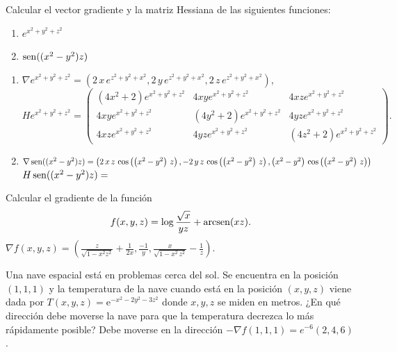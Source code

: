 {Calcular el vector gradiente y la matriz Hessiana de las siguientes funciones:
\begin{multicols}{2}
\begin{enumerate}
\item $e^{x^2+y^2+z^2}$
\item $\operatorname{sen}((x^2-y^2)z)$
\end{enumerate}
\end{multicols}
}
{\begin{enumerate}
\item $\nabla e^{x^2+y^2+z^2} = \left( 2\,x\,e^{z^2+y^2+x^2} , 2\,y\,e^{z^2+y^2+x^2} , 2\,z\,e^{z^2 +y^2+x^2} \right)$,\\
$
H e^{x^2+y^2+z^2} =
\left(
\begin{array}{ccc}
(4x^2+2)e^{x^2+y^2+z^2} & 4xye^{x^2+y^2+z^2} & 4xze^{x^2+y^2+z^2} \\
4xye^{x^2+y^2+z^2} & (4y^2+2)e^{x^2+y^2+z^2} & 4yze^{x^2+y^2+z^2} \\
4xze^{x^2+y^2+z^2} & 4yze^{x^2+y^2+z^2} & (4z^2+2)e^{x^2+y^2+z^2}
\end{array}
\right).
$
\item $\nabla \operatorname{sen}((x^2-y^2)z) = \left( 2\,x\,z\,\cos \left(\left(x^2-y^2\right)\,z\right) , -2\,y\, z\,\cos \left(\left(x^2-y^2\right)\,z\right) , \left(x^2-y^2\right) \,\cos \left(\left(x^2-y^2\right)\,z\right) \right) $\\
$H \operatorname{sen}((x^2-y^2)z) =$\\
\end{enumerate}
}
{
}


{Calcular el gradiente de la función
\[ f(x,y,z)=\log \frac{\sqrt{x}}{yz}+\operatorname{arcsen} (xz). \]
}
{$\nabla f(x,y,z) = \left( \frac{z}{\sqrt{1-x^2z^2}}+\frac{1}{2x} ,\frac{-1}{y} , \frac{x}{\sqrt{1-x^2\,z^2}}-\frac{1}{z} \right) $.
}
{
}


{Una nave espacial está en problemas cerca del sol.
Se encuentra en la posición $(1,1,1)$ y la temperatura de la nave cuando está en la posición $(x,y,z)$ viene dada por
$T(x,y,z)=\mbox{e}^{-x^2-2y^2-3z^2}$ donde $x,y,z$ se miden en metros.
¿En qué dirección debe moverse la nave para que la temperatura decrezca lo más rápidamente posible? }
{Debe moverse en la dirección $-\nabla f(1,1,1)=e^{-6}(2,4,6)$.
}
{
}

